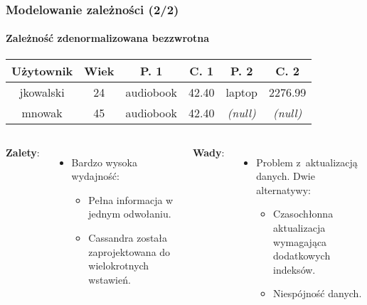 \documentclass{beamer}
\begin{document}
	\begin{frame}
		\frametitle{Modelowanie zależności (2/2)}
		\framesubtitle{Zależność zdenormalizowana bezzwrotna}

		\begin{center}
			\begin{tabular}{c|c|c|c|c|c}
				\multicolumn{1}{c}{\textbf{Użytownik}} & \multicolumn{1}{c}{\textbf{Wiek}} & \multicolumn{1}{c}{\textbf{P. 1}} & \multicolumn{1}{c}{\textbf{C. 1}} & \multicolumn{1}{c}{\textbf{P. 2}} & \multicolumn{1}{c}{\textbf{C. 2}}\\
				\hline
				\cellcolor{red!10}jkowalski & 24 & audiobook & 42.40 & laptop & 2276.99 \\
				\hline
				\cellcolor{red!10}mnowak & 45 & audiobook & 42.40 & \textit{(null)} & \textit{(null)} \\
				\hline
			\end{tabular}
		\end{center}

		\begin{columns}[t]

				\textbf{Zalety}:

				\begin{itemize}
					\item Bardzo wysoka wydajność:

					\begin{itemize}
						\item Pełna informacja w jednym odwołaniu.
						\item Cassandra została zaprojektowana do wielokrotnych wstawień.
					\end{itemize}

				\end{itemize}


				\textbf{Wady}:

				\begin{itemize}
					\item Problem z~aktualizacją danych. Dwie alternatywy:

					\begin{itemize}
						\item Czasochłonna aktualizacja wymagająca dodatkowych indeksów.
						\item Niespójność danych.
					\end{itemize}
				\end{itemize}
		\end{columns}
	\end{frame}
\end{document}
